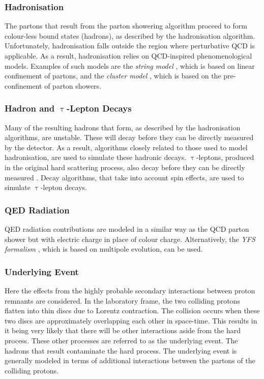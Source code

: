 \subsubsection{Hadronisation}
The partons that result from the parton showering algorithm proceed to form colour-less bound states (hadrons), as described by the hadronisation algorithm. Unfortunately, hadronisation falls outside the region where perturbative QCD is applicable. As a result, hadronisation relies on QCD-inspired phenomenological models. Examples of such models are the \emph{string model} \cite{string_model}, which is based on linear confinement of partons, and the \emph{cluster model} \cite{cluster_model}, which is based on the pre-confinement of parton showers.
\subsubsection{Hadron and $\uptau$-Lepton Decays}
Many of the resulting hadrons that form, as described by the hadronisation algorithms, are unstable. These will decay before they can be directly measured by the detector. As a result, algorithms closely related to those used to model hadronisation, are used to simulate these hadronic decays. $\uptau$-leptons, produced in the original hard scattering process, also decay before they can be directly measured \cite{ATLAS}. Decay algorithms, that take into account spin effects, are used to simulate $\uptau$-lepton decays.
\subsubsection{QED Radiation}
QED radiation contributions are modeled in a similar way as the QCD parton shower but with electric charge in place of colour charge. Alternatively, the \emph{YFS formalism} \cite{YFS}, which is based on multipole evolution, can be used.
\subsubsection{Underlying Event}
Here the effects from the highly probable secondary interactions between proton remnants are considered. In the laboratory frame, the two colliding protons flatten into thin discs due to Lorentz contraction. The collision occurs when these two discs are approximately overlapping each other in space-time. This results in it being very likely that there will be other interactions aside from the hard process. These other processes are referred to as the underlying event. The hadrons that result contaminate the hard process. The underlying event is generally modeled in terms of additional interactions between the partons of the colliding protons.
